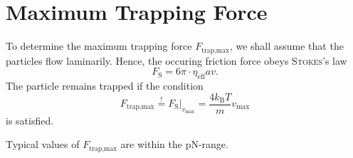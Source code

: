 \section{Maximum Trapping Force}
To determine the maximum trapping force $F_\text{trap,max}$, we shall assume that the particles flow laminarily.
Hence, the occuring friction force obeys \textsc{Stokes}'s law
\begin{equation*}
	F_\text{S} = 6\pi\cdot\eta_\text{eff}av.
\end{equation*}
The particle remains trapped if the condition
\begin{equation}\label{eq:max_trap}
	F_\text{trap,max} \stackrel{!}{=} F_\text{S}\rvert_{v_\text{max}} = \frac{4k_\text{B}T}{m}v_\text{max}
\end{equation}
is satisfied.

Typical values of $F_\text{trap,max}$ are within the \si{\pico\newton}-range.
